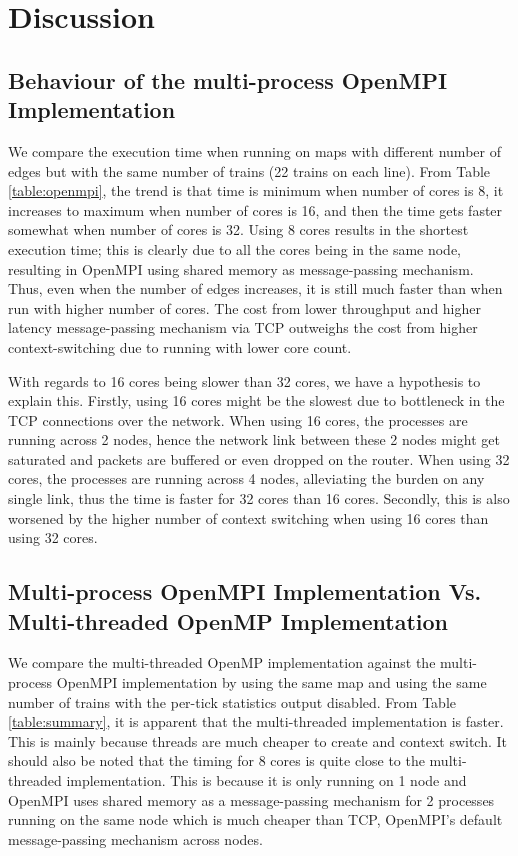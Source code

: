 \documentclass[a4paper,12pt]{article}
\begin{document}
\section{Discussion}
\subsection{Behaviour of the multi-process OpenMPI Implementation}
We compare the execution time when running on maps with different number of edges but with the same number of trains (22 trains on each line). From Table \ref{table:openmpi}, the trend is that time is minimum when number of cores is 8, it increases to maximum when number of cores is 16, and then the time gets faster somewhat when number of cores is 32. Using 8 cores results in the shortest execution time; this is clearly due to all the cores being in the same node, resulting in OpenMPI using shared memory as message-passing mechanism. Thus, even when the number of edges increases, it is still much faster than when run with higher number of cores. The cost from lower throughput and higher latency message-passing mechanism via TCP outweighs the cost from higher context-switching due to running with lower core count.

With regards to 16 cores being slower than 32 cores, we have a hypothesis to explain this. Firstly, using 16 cores might be the slowest due to bottleneck in the TCP connections over the network. When using 16 cores, the processes are running across 2 nodes, hence the network link between these 2 nodes might get saturated and packets are buffered or even dropped on the router. When using 32 cores, the processes are running across 4 nodes, alleviating the burden on any single link, thus the time is faster for 32 cores than 16 cores. Secondly, this is also worsened by the higher number of context switching when using 16 cores than using 32 cores.

\subsection{Multi-process OpenMPI Implementation Vs. Multi-threaded OpenMP Implementation}
We compare the multi-threaded OpenMP implementation against the multi-process OpenMPI implementation by using the same map and using the same number of trains with the per-tick statistics output disabled. From Table \ref{table:summary}, it is apparent that the multi-threaded implementation is faster. This is mainly because threads are much cheaper to create and context switch. It should also be noted that the timing for 8 cores is quite close to the multi-threaded implementation. This is because it is only running on 1 node and OpenMPI uses shared memory as a message-passing mechanism for 2 processes running on the same node which is much cheaper than TCP, OpenMPI's default message-passing mechanism across nodes.
\end{document}

